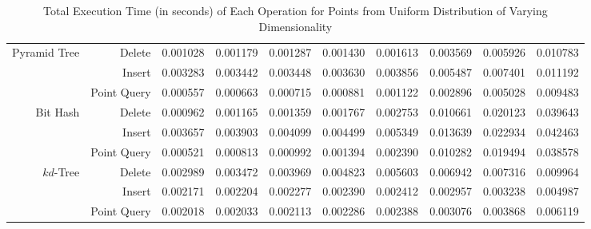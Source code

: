 \begin{landscape}
\begin{table}
{\begin{tabular}{|r|r|l|l|l|l|l|l|l|l|}
\hline
\multirow{3}{*}{Pyramid Tree} & Delete & 0.001028 & 0.001179 & 0.001287 & 0.001430 & 0.001613 & 0.003569 & 0.005926 & 0.010783 \\
& Insert & 0.003283 & 0.003442 & 0.003448 & 0.003630 & 0.003856 & 0.005487 & 0.007401 & 0.011192 \\ 
& Point Query & 0.000557 & 0.000663 & 0.000715 & 0.000881 & 0.001122 & 0.002896 & 0.005028 & 0.009483 \\ 
\hline
\multirow{3}{*}{Bit Hash} & Delete & 0.000962 & 0.001165 & 0.001359 & 0.001767 & 0.002753 & 0.010661 & 0.020123 & 0.039643 \\
& Insert & 0.003657 & 0.003903 & 0.004099 & 0.004499 & 0.005349 & 0.013639 & 0.022934 & 0.042463 \\ 
& Point Query & 0.000521 & 0.000813 & 0.000992 & 0.001394 & 0.002390 & 0.010282 & 0.019494 & 0.038578 \\ 
\hline
\multirow{3}{*}{$kd$-Tree} & Delete & 0.002989 & 0.003472 & 0.003969 & 0.004823 & 0.005603 & 0.006942 & 0.007316 & 0.009964 \\
& Insert & 0.002171 & 0.002204 & 0.002277 & 0.002390 & 0.002412 & 0.002957 & 0.003238 & 0.004987 \\ 
& Point Query & 0.002018 & 0.002033 & 0.002113 & 0.002286 & 0.002388 & 0.003076 & 0.003868 & 0.006119 \\ 
\hline
		\end{tabular}
	}%

	\caption{Total Execution Time (in seconds) of Each Operation for Points from Uniform Distribution of Varying Dimensionality}
	\label{tab:perf-synthetic-randuniform-times}
\end{table}



\end{landscape}
